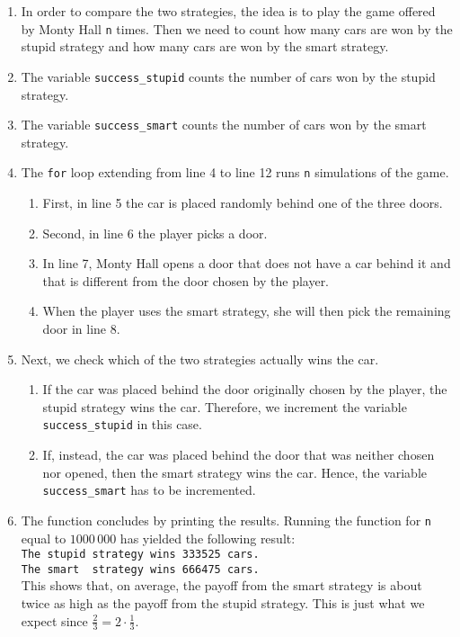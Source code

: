 \begin{enumerate}
\item In order to compare the two strategies, the idea is to play the game offered by Monty Hall
      \texttt{n} times.  Then we need to count how many cars are won by the stupid strategy and how
      many cars are won by the smart strategy.
\item The variable \texttt{success\_stupid} counts the number of cars won by the stupid strategy.
\item The variable \texttt{success\_smart}  counts the number of cars won by the smart  strategy.
\item The \texttt{for} loop extending from line 4 to line 12 runs \texttt{n} simulations of the
       game.
       \begin{enumerate}
       \item First, in line 5 the car is placed randomly behind one of the three doors.
       \item Second, in line 6 the player picks a door.
       \item In line 7, Monty Hall opens a door that does not have a car behind it and that
             is different from the door chosen by the player.
       \item When the player uses the smart strategy, she will then pick the remaining door in line 8.
       \end{enumerate}
\item Next, we check which of the two strategies actually wins the car.
      \begin{enumerate}
      \item If the car was placed behind the door originally chosen by the player, the stupid
            strategy wins the car.  Therefore, we increment the variable \texttt{success\_stupid} in
            this case.
      \item If, instead, the car was placed behind the door that was neither chosen nor opened, then
            the smart strategy wins the car.  Hence, the variable \texttt{success\_smart} has to be incremented.
      \end{enumerate}
\item The function concludes by printing the results.  Running the function for \texttt{n} equal to
      $1000\,000$ has yielded the following result:
      \\[0.2cm]
      \hspace*{1.3cm}
      \texttt{The stupid strategy wins 333525 cars.} \\ 
      \hspace*{1.3cm}
      \texttt{The smart \ strategy wins 666475 cars.}
      \\[0.2cm]
      This shows that, on average, the payoff from the smart strategy is about twice as high as the
      payoff from the stupid strategy.  This is just what we expect since $\frac{2}{3} = 2 \cdot \frac{1}{3}$.
\end{enumerate}


